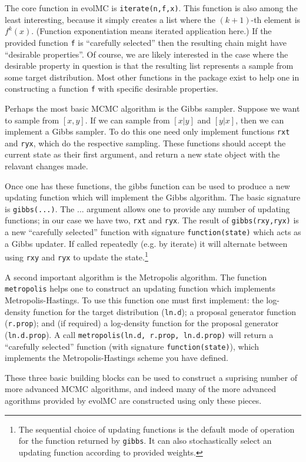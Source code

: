 \documentclass[12pt]{article}\usepackage[]{graphicx}\usepackage[]{color}
\begin{document}
The core function in evolMC is
\texttt{iterate(n,f,x)}. This function is also among the least
interesting, because it simply creates a list where the $(k+1)$-th element
is $f^{k}(x)$. (Function exponentiation means iterated application
here.) If the provided function {\tt f} is ``carefully selected'' then the
resulting chain might have ``desirable properties''. Of course, we are
likely interested in the case where the desirable property in
question is that the resulting list represents a sample from some
target distribution. Most other functions in the package exist to help
one in constructing a function {\tt f} with specific desirable properties.

Perhaps the most basic MCMC algorithm is the Gibbs sampler. Suppose we
want to sample from $[x,y]$. If we can sample from $[x|y]$ and
$[y|x]$, then we can implement a Gibbs sampler. To do this one need
only implement functions {\tt rxt} and {\tt ryx}, which do the
respective sampling. These
functions should accept the current state as their first argument, and
return a new state object with the relavant changes made.

Once one has these functions, the gibbs function can be used to
produce a new updating function which will implement the Gibbs
algorithm. The basic signature is {\tt gibbs(...)}. The ...  argument
allows one to provide any number of updating functions; in our case we
have two, {\tt rxt} and {\tt ryx}. The result of {\tt gibbs(rxy,ryx)}
is a new ``carefully selected'' function with signature
\texttt{function(state)} which acts as a Gibbs updater. If called
repeatedly (e.g. by iterate) it will alternate between using {\tt rxy}
and {\tt ryx} to update the state.\footnote{The sequential choice of
  updating functions is the default mode of operation for the function
  returned by {\tt gibbs}. It can also stochastically select an
  updating function according to provided weights.}

A second important algorithm is the Metropolis algorithm. The function
{\tt metropolis} helps one to construct an updating function which
implements Metropolis-Hastings. To use this function one must first implement:
the log-density function for the target distribution ({\tt ln.d}); a proposal
generator function ({\tt r.prop}); and (if required) a log-density function for the
proposal generator ({\tt ln.d.prop}). A call {\tt metropolis(ln.d,
  r.prop, ln.d.prop)} will return a ``carefully selected'' function
(with signature {\tt function(state)}), which implements the
Metropolis-Hastings scheme you have defined.

These three basic building blocks can be used to construct a suprising
number of more advanced MCMC algorithms, and indeed many of the more
advanced agorithms provided by evolMC are constructed using only these pieces.
\end{document}
